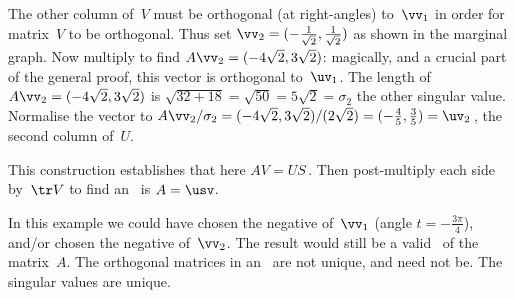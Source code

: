 \begin{example}
\begin{solution}
The other column of~\(V\) must be orthogonal (at right-angles) to~\(\vv_1\) in order for matrix~\(V\) to be orthogonal.
%
Thus set \(\vv_2=(-\frac1{\sqrt2},\frac1{\sqrt2})\) as shown in the marginal graph.
Now multiply to find \(A\vv_2=(-4\sqrt2,3\sqrt2)\):
magically, and a crucial part of the general proof, this vector is orthogonal to~\(\uv_1\).
The length of \(A\vv_2=(-4\sqrt2,3\sqrt2)\) is \(\sqrt{32+18}=\sqrt{50}=5\sqrt2=\sigma_2\) the other singular value.
Normalise the vector to \(A\vv_2/\sigma_2 =(-4\sqrt2,3\sqrt2)/(2\sqrt2)=(-\frac45,\frac35)=\uv_2\)\,, the second column of~\(U\).

This construction establishes that here \(AV=US\)\,. 
Then post-multiply each side by~\(\tr V\) to find an \svd\ is \(A=\usv\).

In this example we could have chosen the negative of~\(\vv_1\) (angle \(t=-\frac{3\pi}4\)), and/or chosen the negative of~\(\vv_2\). 
The result would still be a valid \svd\ of the matrix~\(A\).
The orthogonal matrices in an \svd\ are not unique, and need not be. The singular values are unique.
\end{solution}
\end{example}

